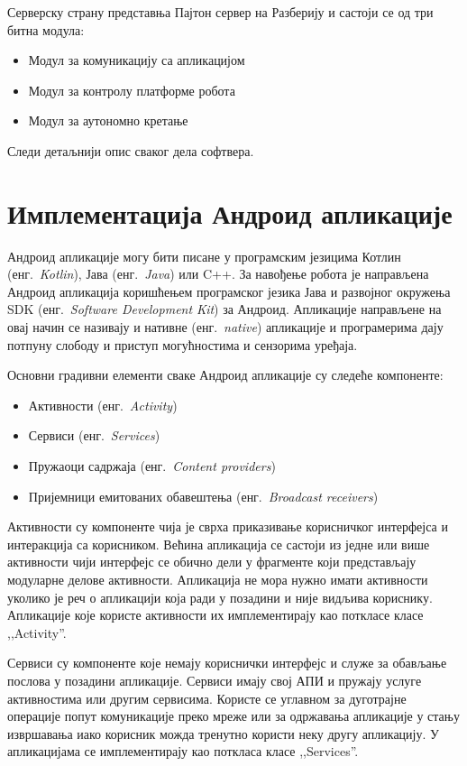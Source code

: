 \documentclass[12pt,oneside]{memoir}
\theoremstyle{remark}
\begin{document}
Серверску страну представња Пајтон сервер на Разберију и састоји се од три битна модула:
\begin{itemize}
\item Модул за комуникацију са апликацијом
\item Модул за контролу платформе робота
\item Модул за аутономно кретање
\end{itemize}

Следи детаљнији опис сваког дела софтвера.

\section{Имплементација Андроид апликације}
Андроид апликације могу бити писане у програмским језицима Котлин (енг.~{\em Kotlin}), Јава (енг.~{\em Java}) или C++. За навођење робота је направљена Андроид апликација коришћењем програмског језика Јава и развојног окружења SDK (енг.~{\em Software Development Kit}) за Андроид. Апликације направљене на овај начин се називају и нативне (енг.~{\em native}) апликације и програмерима дају потпуну слободу и приступ могућностима и сензорима уређаја. 

Основни градивни елементи сваке Андроид апликације су следеће компоненте:
\begin{itemize}
\item Активности  (енг.~{\em Activity})
\item Сервиси (енг.~{\em Services})
\item Пружаоци садржаја (енг.~{\em Content providers})
\item Пријемници емитованих обавештења (енг.~{\em Broadcast receivers})
\end{itemize}

Активности су компоненте чија је сврха приказивање корисничког интерфејса и интеракција са корисником. Већина апликација се састоји из једне или више активности чији интерфејс се обично дели у фрагменте који представљају модуларне делове активности. Апликација не мора нужно имати активности уколико је реч о апликацији која ради у позадини и није видљива кориснику. Апликације које користе активности их имплементирају као поткласе класе ,,Activity''.

Сервиси су компоненте које немају кориснички интерфејс и служе за обављање послова у позадини апликације. Сервиси имају свој АПИ и пружају услуге активностима или другим сервисима. Користе се углавном за дуготрајне операције попут комуникације преко мреже или за одржавања апликације у стању извршавања иако корисник можда тренутно користи неку другу апликацију. У апликацијама се имплементирају као поткласа класе ,,Services''.
\end{document}
